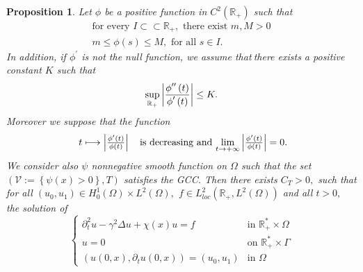 \documentclass[11pt,reqno]{amsart}
\theoremstyle{plain}
\newtheorem{proposition}{Proposition}
\numberwithin{equation}{section}
\numberwithin{equation}{section}
\begin{document}
\begin{proposition}
Let $\phi $ be a positive function in $C^{2}\left( 
\mathbb{R}
_{+}\right) $ such that%
\begin{equation}
\begin{array}{l}
\text{for every }I\subset \subset 
\mathbb{R}
_{+},\text{ there exist }m,M>0 \\ 
m\leq \phi \left( s\right) \leq M,\text{ for all }s\in I\text{.}%
\end{array}
\label{PHY assumption}
\end{equation}%
In addition, if $\phi ^{\prime }$ is not the null function, we assume that$\ 
$there exists a positive constant $K$ such that%
\begin{equation}
\underset{%
\mathbb{R}
_{+}}{\sup }\left\vert \frac{\phi ^{\prime \prime }\left( t\right) }{\phi
^{\prime }\left( t\right) }\right\vert \leq K.  \label{PHY assumption 1}
\end{equation}%
Moreover we suppose that the function%
\begin{equation}
\begin{array}{c}
\text{ \ \ }t\longmapsto \left\vert \frac{\phi ^{\prime }\left( t\right) }{%
\phi \left( t\right) }\right\vert \text{ is decreasing and }\underset{%
t\rightarrow +\infty }{\lim }\left\vert \frac{\phi ^{\prime }\left( t\right) 
}{\phi \left( t\right) }\right\vert =0.\text{\ \ }%
\end{array}
\label{PHY assumption 2}
\end{equation}%
We consider also $\psi $ nonnegative smooth function on $\Omega $ such that
the set $\left( \mathcal{V}:=\left\{ \psi \left( x\right) >0\right\}
,T\right) $ satisfies the GCC. Then there exists $C_{T}>0,$ such that for
all $\left( u_{0},u_{1}\right) \in H_{0}^{1}\left( \Omega \right) \times
L^{2}\left( \Omega \right) ,$ $f\in L_{loc}^{2}\left( 
\mathbb{R}
_{+},L^{2}\left( \Omega \right) \right) $ and all $t>0,$ the solution of 
\begin{equation}
\left\{ 
\begin{array}{ll}
\partial _{t}^{2}u-\gamma ^{2}\Delta u+\chi \left( x\right) u=f & \text{in }%
\mathbb{R}_{+}^{\ast }\times \Omega \\ 
u=0 & \text{on }\mathbb{R}_{+}^{\ast }\times \Gamma \\ 
\left( u\left( 0,x\right) ,\partial _{t}u\left( 0,x\right) \right) =\left(
u_{0},u_{1}\right) & \text{in }\Omega%

\end{array}
\end{equation}
\end{proposition}
\end{document}
